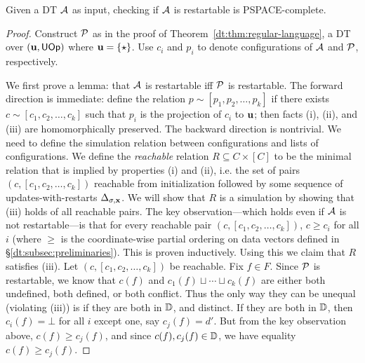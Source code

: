 \begin{theorem}
Given a DT $\mathcal{A}$ as input,
checking if $\mathcal{A}$ is restartable is PSPACE-complete.
\label{dt:thm:restartable-pspace-complete}
\end{theorem}
\begin{proof}
Construct $\mathcal{P}$ as in the proof of Theorem~\ref{dt:thm:regular-language}, a DT over $(\textbf{u}, \textsf{UOp})$ where $\textbf{u} = \{\star\}$.
Use $c_i$ and $p_i$ to denote configurations of $\mathcal{A}$ and $\mathcal{P}$, respectively.

We first prove a lemma: that $\mathcal{A}$ is restartable iff $\mathcal{P}$ is restartable.
The forward direction is immediate:
define the relation $p \sim [p_1, p_2, \ldots, p_k]$
if there exists $c \sim [c_1, c_2, \ldots, c_k]$
such that $p_i$ is the projection of $c_i$ to $\textbf{u}$;
then facts (i), (ii), and (iii) are homomorphically preserved.
The backward direction is nontrivial.
We need to define the simulation relation
between configurations and lists of configurations.
We define the \emph{reachable} relation $R \subseteq C \times [C]$
to be the minimal relation that is implied by properties (i) and (ii), i.e. the set of pairs
$(c, [c_1, c_2, \ldots, c_k])$ reachable from initialization followed
by some sequence of updates-with-restarts $\Delta_{\sigma,\textbf{x}}$.
We will show that $R$ is a simulation by showing that
(iii) holds of all reachable pairs.
The key observation---which holds even if
$\mathcal{A}$ is not restartable---is that for every reachable pair
$(c, [c_1, c_2, \ldots, c_k])$,
$c \ge c_i$ for all $i$ (where $\ge$ is the coordinate-wise partial ordering on data vectors defined in \S\ref{dt:subsec:preliminaries}).
This is proven inductively.
Using this we claim that $R$ satisfies (iii).
Let $(c, [c_1, c_2, \ldots, c_k])$ be reachable.
Fix $f \in F$.
Since $\mathcal{P}$ is restartable, we know that
$c(f)$ and $c_1(f) \sqcup \cdots \sqcup c_k(f)$ are either both undefined, both defined, or both conflict.
Thus the only way they can be unequal (violating (iii)) is if they are both in $\mathbb{D}$, and distinct.
If they are both in $\mathbb{D}$, then $c_i(f) = \bot$ for all $i$ except one, say $c_j(f) = d'$.
But from the key observation above, $c(f) \ge c_j(f)$, and since $c(f), c_j(f) \in \mathbb{D}$, we have equality $c(f) \ge c_j(f)$.


\end{proof}
